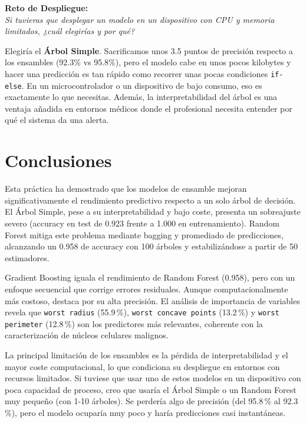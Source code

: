 \documentclass[../../__memoria.tex]{subfiles}
\begin{document}
\vspace{0.3cm}

\textbf{Reto de Despliegue:} \\
\textit{Si tuvieras que desplegar un modelo en un dispositivo con CPU y memoria limitados, ¿cuál elegirías y por qué?}

Elegiría el \textbf{Árbol Simple}. Sacrificamos unos 3.5 puntos de precisión respecto a los ensambles (92.3\% vs 95.8\%), pero el modelo cabe en unos pocos kilobytes y hacer una predicción es tan rápido como recorrer unas pocas condiciones \texttt{if-else}. En un microcontrolador o un dispositivo de bajo consumo, eso es exactamente lo que necesitas. Además, la interpretabilidad del árbol es una ventaja añadida en entornos médicos donde el profesional necesita entender por qué el sistema da una alerta.

\section*{Conclusiones}

Esta práctica ha demostrado que los modelos de ensamble mejoran significativamente el rendimiento predictivo respecto a un solo árbol de decisión. El Árbol Simple, pese a su interpretabilidad y bajo coste, presenta un sobreajuste severo (accuracy en test de 0.923 frente a 1.000 en entrenamiento). Random Forest mitiga este problema mediante bagging y promediado de predicciones, alcanzando un 0.958 de accuracy con 100 árboles y estabilizándose a partir de 50 estimadores.

Gradient Boosting iguala el rendimiento de Random Forest (0.958), pero con un enfoque secuencial que corrige errores residuales. Aunque computacionalmente más costoso, destaca por su alta precisión. El análisis de importancia de variables revela que \texttt{worst radius} (55.9\,\%), \texttt{worst concave points} (13.2\,\%) y \texttt{worst perimeter} (12.8\,\%) son los predictores más relevantes, coherente con la caracterización de núcleos celulares malignos.

La principal limitación de los ensambles es la pérdida de interpretabilidad y el mayor coste computacional, lo que condiciona su despliegue en entornos con recursos limitados. Si tuviese que usar uno de estos modelos en un dispositivo con poca capacidad de proceso, creo que usaría el Árbol Simple o un Random Forest muy pequeño (con 1-10 árboles). Se perdería algo de precisión (del 95.8\,\% al 92.3\,\%), pero el modelo ocuparía muy poco y haría predicciones casi instantáneas.

\vspace{1.0cm}
\end{document}
